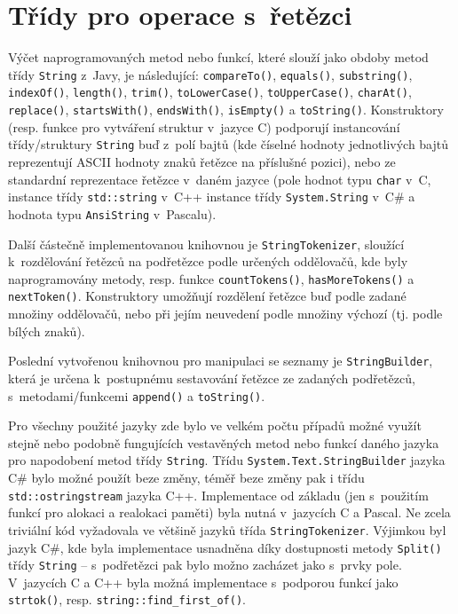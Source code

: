 \documentclass[czech,BP]{thesiskiv}
\begin{document}
\section{Třídy pro operace s~řetězci}
Výčet naprogramovaných metod nebo funkcí, které slouží jako obdoby metod třídy \texttt{String} z~Javy, je následující: \texttt{compareTo()}, \texttt{equals()}, \texttt{substring()}, \texttt{indexOf()}, \texttt{length()}, \texttt{trim()}, \texttt{toLowerCase()}, \texttt{toUpperCase()}, \texttt{charAt()}, \texttt{replace()}, \texttt{startsWith()}, \texttt{endsWith()}, \texttt{isEmpty()} a \texttt{toString()}. Konstruktory (resp. funkce pro vytváření struktur v~jazyce C) podporují instancování třídy/struktury \texttt{String} buď z~polí bajtů (kde číselné hodnoty jednotlivých bajtů reprezentují ASCII hodnoty znaků řetězce na příslušné pozici), nebo ze standardní reprezentace řetězce v~daném jazyce (pole hodnot typu \texttt{char} v~C, instance třídy \texttt{std::string} v~C++ instance třídy \texttt{System.String} v~C\# a hodnota typu \texttt{AnsiString} v~Pascalu).\par
Další částečně implementovanou knihovnou je \texttt{StringTokenizer}, sloužící k~rozdělování řetězců na podřetězce podle určených oddělovačů, kde byly naprogramovány metody, resp. funkce \texttt{countTokens()}, \texttt{hasMoreTokens()} a \texttt{nextToken()}. Konstruktory umožňují rozdělení řetězce buď podle zadané množiny oddělovačů, nebo při jejím neuvedení podle množiny výchozí (tj. podle bílých znaků).\par
Poslední vytvořenou knihovnou pro manipulaci se seznamy je \texttt{String\-Builder}, která je určena k~postupnému sestavování řetězce ze zadaných podřetězců, s~metodami/funkcemi \texttt{append()} a \texttt{toString()}.\par
Pro všechny použité jazyky zde bylo ve velkém počtu případů možné využít stejně nebo podobně fungujících vestavěných metod nebo funkcí daného jazyka pro napodobení metod třídy \texttt{String}. Třídu \texttt{System.Text.String\-Builder} jazyka C\# bylo možné použít beze změny, téměř beze změny pak i třídu \texttt{std::ostringstream} jazyka C++. Implementace od základu (jen s~použitím funkcí pro alokaci a realokaci paměti) byla nutná v~jazycích C a Pascal. Ne zcela triviální kód vyžadovala ve většině jazyků třída \texttt{String\-Tokenizer}. Výjimkou byl jazyk C\#, kde byla implementace usnadněna díky dostupnosti metody \texttt{Split()} třídy \texttt{String} -- s~podřetězci pak bylo možno zacházet jako s~prvky pole. V~jazycích C a C++ byla možná implementace s~podporou funkcí jako \texttt{strtok()}, resp. \texttt{string::find\_first\_of()}.
\end{document}
